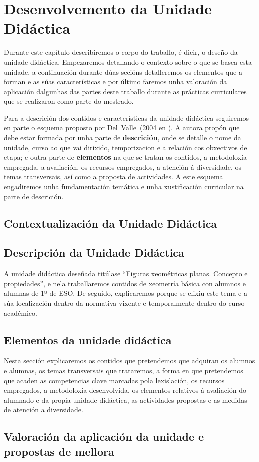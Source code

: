 \chapter{Desenvolvemento da Unidade Didáctica}\label{chap:desenvolvemento}
Durante este capítulo describiremos o corpo do traballo, é dicir, o deseño da unidade didáctica. Empezaremos detallando o contexto sobre o que se basea esta unidade, a continuación durante dúas secións detalleremos os elementos que a forman e as súas características e por último faremos unha valoración da aplicación dalgunhas das partes deste traballo durante as prácticas curriculares que se realizaron como parte do mestrado.

Para a descrición dos contidos e características da unidade didáctica seguiremos en parte o esquema proposto por Del~Valle~(2004 en ). A autora propón que debe estar formada por unha parte de \textbf{descrición}, onde se detalle o nome da unidade, curso ao que vai dirixido, temporizacion e a relación cos obxectivos de etapa; e outra parte de \textbf{elementos} na que se tratan os contidos, a metodoloxía empregada, a avaliación, os recursos empregados, a atención á diversidade, os temas transversais, así como a proposta de actividades. A este esquema engadiremos unha fundamentación temática e unha xustificación curricular na parte de descrición.

\section{Contextualización da Unidade Didáctica}


\section{Descripción da Unidade Didáctica}
A unidade didáctica deseñada titúlase ``Figuras xeométricas planas. Concepto e propiedades'', e nela traballaremos contidos de xeometría básica con alumnos e alumnas de 1º de ESO. De seguido, explicaremos porque se elixiu este tema e a súa localización dentro da normativa vixente e temporalmente dentro do curso académico.





\section{Elementos da unidade didáctica}
Nesta sección explicaremos os contidos que pretendemos que adquiran os alumnos e alumnas, os temas transversais que trataremos, a forma en que pretendemos que acaden as competencias clave marcadas pola lexislación, os recursos empregados, a metodoloxía desenvolvida, os elementos relativos á avaliación do alumnado e da propia unidade didáctica, as actividades propostas e as medidas de atención a diversidade.









\section{Valoración da aplicación da unidade e propostas de mellora}


